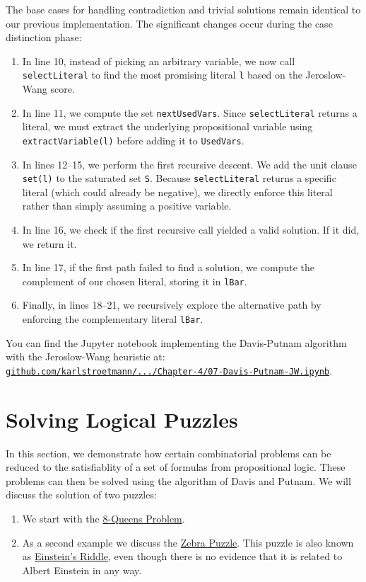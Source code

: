 The base cases for handling contradiction and trivial solutions remain identical to our previous implementation. The significant changes occur during the case distinction phase:
\begin{enumerate}
\item In line 10, instead of picking an arbitrary variable, we now call \texttt{selectLiteral} to find the most
  promising literal \texttt{l} based on the Jeroslow-Wang score. 
\item In line 11, we compute the set \texttt{nextUsedVars}. Since \texttt{selectLiteral} returns a literal, we must extract the underlying propositional variable using \texttt{extractVariable(l)} before adding it to \texttt{UsedVars}.
\item In lines 12--15, we perform the first recursive descent. We add the unit clause \texttt{set(l)} to the saturated set \texttt{S}. Because \texttt{selectLiteral} returns a specific literal (which could already be negative), we directly enforce this literal rather than simply assuming a positive variable.
\item In line 16, we check if the first recursive call yielded a valid solution. If it did, we return it.
\item In line 17, if the first path failed to find a solution, we compute the complement of our chosen literal, storing it in \texttt{lBar}.
\item Finally, in lines 18--21, we recursively explore the alternative path by enforcing the complementary literal \texttt{lBar}.
\end{enumerate}
You can find the Jupyter notebook implementing the Davis-Putnam algorithm with the Jeroslow-Wang heuristic at:
\\[0.2cm]
\hspace*{1.3cm}
\href{https://github.com/karlstroetmann/Logic/blob/master/TypeScript/Chapter-4/07-Davis-Putnam-JW.ipynb}{\texttt{github.com/karlstroetmann/.../Chapter-4/07-Davis-Putnam-JW.ipynb}}.


\section{Solving Logical Puzzles}
In this section, we demonstrate how certain combinatorial problems can be reduced to the satisfiablity of a
set of formulas from propositional logic.  These problems can then be solved using the algorithm of
Davis and Putnam.  We will discuss the solution of two puzzles:
\begin{enumerate}
\item We start with the
      \href{https://en.wikipedia.org/wiki/Eight_queens_puzzle}{8-Queens Problem}. 
\item As a second example we discuss the
      \href{https://en.wikipedia.org/wiki/Zebra_puzzle}{Zebra Puzzle}.  This puzzle is also known as
      \href{https://www.brainzilla.com/logic/zebra/einsteins-riddle/}{Einstein's Riddle},
      even though there is no evidence that it is related to Albert Einstein in any way.
\end{enumerate}

